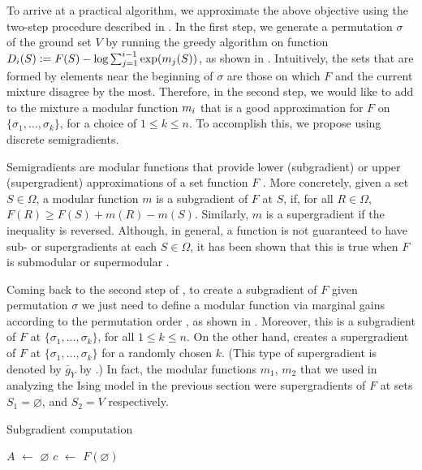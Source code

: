 To arrive at a practical algorithm, we approximate the above objective using the two-step procedure described in .
In the first step, we generate a permutation $\sigma$ of the ground set $V$ by running the greedy algorithm on function $D_i(S) \vcentcolon= F(S) - \log \sum_{j=1}^{i-1} \exp(m_j(S))$, as shown in .
Intuitively, the sets that are formed by elements near the beginning of $\sigma$ are those on which $F$ and the current mixture disagree by the most.
Therefore, in the second step, we would like to add to the mixture a modular function $m_i$ that is a good approximation for $F$ on $\{\sigma_1, \ldots, \sigma_k\}$, for a choice of $1 \leq k \leq n$.
To accomplish this, we propose using discrete semigradients.

Semigradients are modular functions that provide lower (subgradient) or upper (supergradient) approximations of a set function $F$ \citep{fujishige05,iyer13}.
More concretely, given a set $S \in \Omega$, a modular function $m$ is a subgradient of $F$ at $S$, if, for all $R \in \Omega$, $F(R) \geq F(S) + m(R) - m(S)$.
Similarly, $m$ is a supergradient if the inequality is reversed.
Although, in general, a function is not guaranteed to have sub- or supergradients at each $S \in \Omega$, it has been shown that this is true when $F$ is submodular or supermodular \citep{fujishige05, jegelka11, iyer12}.

Coming back to the second step of , to create a subgradient of $F$ given permutation $\sigma$ we just need to define a modular function via marginal gains according to the permutation order \citep{iyer13}, as shown in .
Moreover, this is a subgradient of $F$ at $\{\sigma_1, \ldots, \sigma_k\}$, for all $1 \leq k \leq n$.
On the other hand,  creates a supergradient of $F$ at $\{\sigma_1, \ldots, \sigma_k\}$ for a randomly chosen $k$. (This type of supergradient is denoted by $\bar{g}_Y$ by \cite{iyer13}.)
In fact, the modular functions $m_1$, $m_2$ that we used in analyzing the Ising model in the previous section were supergradients of $F$ at sets $S_1 = \varnothing$, and $S_2 = V$ respectively.

\begin{algorithm}[tb]
  \DontPrintSemicolon
  \caption{\strut Subgradient computation}
  \label{alg:sub}
  \vspace{0.5em}
  \SetKwInOut{Input}{Input}
  \Input{Set function $F$, permutation $\sigma$}
  $A$ $\gets$ $\varnothing$\;
  $c$ $\gets$ $F(\varnothing)$\;
  \For{$v = 1$ \KwTo $n$}{
    $m_v$ $\gets$ $F(A \cup \{\sigma_v\}) - F(A)$\;
    $A$ $\gets$ $A \cup \sigma_v$\;
  }
  \Return{$m(S) \defeq c + \sum_{v \in S} m_v$}\;%
\end{algorithm}

